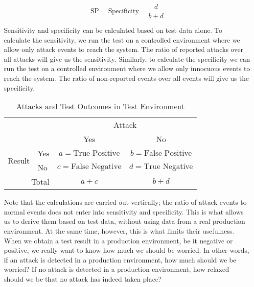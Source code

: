 \documentclass[conference]{IEEEtran}
\begin{document}
\begin{equation}
\textrm{SP} = \textrm{Specificity} = \frac{d}{b + d}
\end{equation}

Sensitivity and specificity can be calculated based on test
data alone. To calculate the sensitivity, we run the test on a
controlled environment where we allow only attack events to reach the
system. The ratio of reported attacks over all attacks will give us
the sensitivity. Similarly, to calculate the specificity we can run
the test on a controlled environment where we allow only innocuous
events to reach the system. The ratio of non-reported events over all
events will give us the specificity. 

\begin{table}[ht]

\caption{Attacks and Test Outcomes in Test Environment}
\label{tab:sensitivity-specificity}

\begin{tabular}{l|l|c|c|}
\multicolumn{2}{c}{} & \multicolumn{2}{c}{Attack} \\ \cline{3-4}
\multicolumn{2}{c|}{} & Yes & No \\ \cline{2-4}
\multirow{2}{*}{Result} &  Yes &  $a = \textrm{True Positive}$ & 
$b = \textrm{False Positive}$ \\
& No & $c = \textrm{False Negative}$ & $d = \textrm{True Negative}$ \\ 
\cline{2-4}
\multicolumn{2}{r|}{Total} & $a + c$ & $b + d$ \\
\cline{3-4}
\end{tabular}

\end{table}

Note that the calculations are carried out vertically; the ratio of
attack events to normal events does not enter into sensitivity and
specificity. This is what allows us to derive them based on test data,
without using data from a real production environment. At the same
time, however, this is what limits their usefulness. When we obtain a
test result in a production environment, be it negative or positive,
we really want to know how much we should be worried. In other words,
if an attack is detected in a production environment, how much should
we be worried? If no attack is detected in a production environment,
how relaxed should we be that no attack has indeed taken place?
\end{document}
